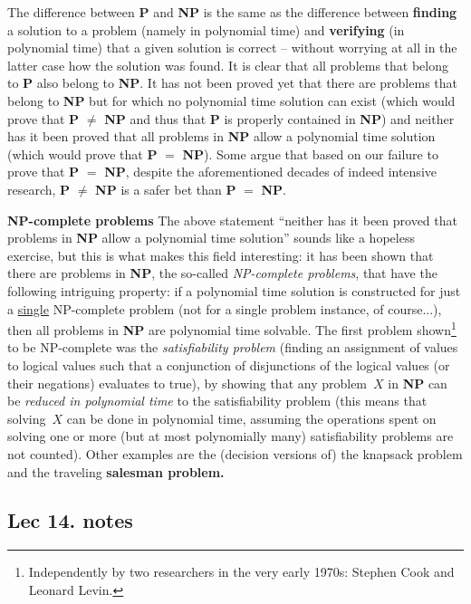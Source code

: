 \documentclass[titlepage]{article}
\theoremstyle{definition}
\numberwithin{equation}{subsection}
\numberwithin{remark}{subsection}
\begin{document}
The difference between {\bf P} and {\bf NP} is the same as the difference between {\bf finding} a solution to a problem (namely in polynomial time) and {\bf verifying} (in polynomial time) that a given solution is correct -- without worrying at all in the latter case how the solution was found.
It is clear that all problems that belong to {\bf P} also belong to {\bf NP}.
It has not been proved yet that there are problems that belong to {\bf NP} but for which no polynomial time solution can exist (which would prove that {\bf P} $\ne$ {\bf NP} and thus that {\bf P} is properly contained in {\bf NP}) and neither has it been proved that all problems in {\bf NP} allow a polynomial time solution (which would prove that {\bf P} $=$ {\bf NP}).
Some argue that based on our failure to prove that {\bf P} $=$ {\bf NP}, despite the aforementioned decades of indeed intensive research, {\bf P} $\ne$ {\bf NP} is a safer bet than {\bf P} $=$ {\bf NP}.\\
\par\noindent
{\bf{NP-complete problems}}
The above statement ``neither has it been proved that {\color{red}{all}} problems in {\bf NP} allow a polynomial time solution'' sounds like a hopeless exercise, but this is what makes this field interesting:
it has been shown that there are problems in {\bf NP}, the so-called \emph{NP-complete problems}, that have the following intriguing property:
if a polynomial time solution is constructed for just a \underline{single} NP-complete problem (not for a single problem instance, of course...), then all problems in {\bf NP} are polynomial time solvable.
The first problem shown\footnote{Independently by two researchers in the very early 1970s: Stephen Cook and Leonard Levin.} to be NP-complete was the \emph{satisfiability problem} (finding an assignment of values to logical values such that a conjunction of disjunctions of the logical values (or their negations) evaluates to true), by showing that any problem~$X$ in {\bf NP} can be \emph{reduced in polynomial time} to the satisfiability problem (this means that solving~$X$ can be done in polynomial time, assuming the operations spent on solving one or more (but at most polynomially many) satisfiability problems are not counted). Other examples are the (decision versions of) the knapsack problem and the traveling \textbf{salesman problem.}

\subsection{Lec 14. notes}
\end{document}
